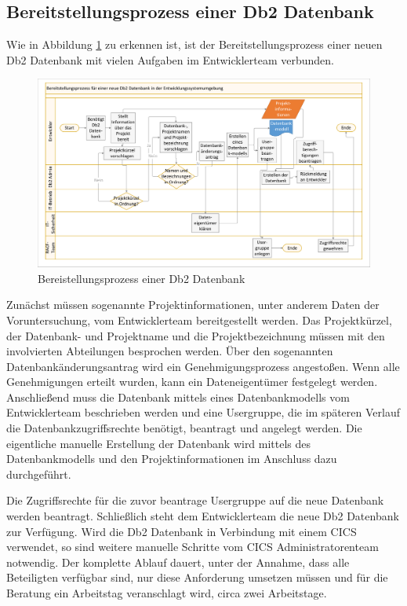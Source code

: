 \subsection{Bereitstellungsprozess einer Db2 Datenbank}
Wie in Abbildung \ref{fig:aktdb2} zu erkennen ist, ist der Bereitstellungsprozess einer neuen Db2 Datenbank mit vielen Aufgaben im Entwicklerteam verbunden.
\begin{figure}[ht!]
\centering
\includegraphics[width=\paperwidth,angle=90]{figures/swimlaneDb2.pdf}
\caption{Bereistellungsprozess einer Db2 Datenbank}
\label{fig:aktdb2}
\end{figure}
Zunächst müssen sogenannte Projektinformationen, unter anderem Daten der Voruntersuchung, vom Entwicklerteam bereitgestellt werden.
Das Projektkürzel, der Datenbank- und Projektname und die Projektbezeichnung müssen mit den involvierten Abteilungen besprochen werden.
Über den sogenannten \glqq Datenbankänderungsantrag\grqq{} wird ein Genehmigungsprozess angestoßen.
Wenn alle Genehmigungen erteilt wurden, kann ein Dateneigentümer festgelegt werden.
Anschließend muss die Datenbank mittels eines Datenbankmodells vom Entwicklerteam beschrieben werden und eine Usergruppe, die im späteren Verlauf die Datenbankzugriffsrechte benötigt, beantragt und angelegt werden.
Die eigentliche manuelle Erstellung der Datenbank wird mittels des Datenbankmodells und den Projektinformationen im Anschluss dazu durchgeführt.

Die Zugriffsrechte für die zuvor beantrage Usergruppe auf die neue Datenbank werden beantragt.
Schließlich steht dem Entwicklerteam die neue Db2 Datenbank zur Verfügung.
Wird die Db2 Datenbank in Verbindung mit einem CICS verwendet, so sind weitere manuelle Schritte vom CICS Administratorenteam notwendig.
Der komplette Ablauf dauert, unter der Annahme, dass alle Beteiligten verfügbar sind, nur diese Anforderung umsetzen müssen und für die Beratung ein Arbeitstag veranschlagt wird, circa zwei Arbeitstage.

